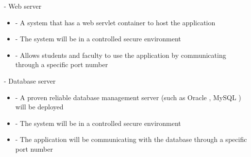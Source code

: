 - Web server 	
  \begin{itemize}
      \item - A system that has a web servlet container to host the application
      \item - The system will be in a controlled secure environment 
      \item- Allows students and faculty to use the application by communicating through a specific port number
  \end{itemize}    
- Database server 
  \begin{itemize}
      \item - A proven reliable database management server (such as Oracle , MySQL ) will be deployed 
      \item - The system will be in a controlled secure environment 
      \item - The application will be communicating with the database through a specific port number
  \end{itemize}
